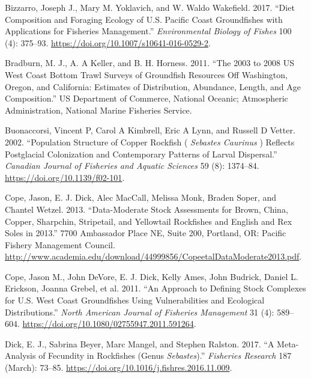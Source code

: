 \documentclass[11pt,
  english,
  a4paper,
]{article}
\begin{document}
\leavevmode\tagmcend\tagstructend


\hypertarget{refs}{}
\begin{cslreferences}
\leavevmode\hypertarget{ref-bizzarro_diet_2017-1}{}%
Bizzarro, Joseph J., Mary M. Yoklavich, and W. Waldo Wakefield. 2017. ``Diet Composition and Foraging Ecology of U.S. Pacific Coast Groundfishes with Applications for Fisheries Management.'' \emph{Environmental Biology of Fishes} 100 (4): 375--93. \url{https://doi.org/10.1007/s10641-016-0529-2}.

\leavevmode\hypertarget{ref-bradburn_2003_2011}{}%
Bradburn, M. J., A. A Keller, and B. H. Horness. 2011. ``The 2003 to 2008 US West Coast Bottom Trawl Surveys of Groundfish Resources Off Washington, Oregon, and California: Estimates of Distribution, Abundance, Length, and Age Composition.'' US Department of Commerce, National Oceanic; Atmospheric Administration, National Marine Fisheries Service.

\leavevmode\hypertarget{ref-buonaccorsi_population_2002}{}%
Buonaccorsi, Vincent P, Carol A Kimbrell, Eric A Lynn, and Russell D Vetter. 2002. ``Population Structure of Copper Rockfish ( \emph{Sebastes Caurinus} ) Reflects Postglacial Colonization and Contemporary Patterns of Larval Dispersal.'' \emph{Canadian Journal of Fisheries and Aquatic Sciences} 59 (8): 1374--84. \url{https://doi.org/10.1139/f02-101}.

\leavevmode\hypertarget{ref-cope_data-moderate_2013}{}%
Cope, Jason, E. J. Dick, Alec MacCall, Melissa Monk, Braden Soper, and Chantel Wetzel. 2013. ``Data-Moderate Stock Assessments for Brown, China, Copper, Sharpchin, Stripetail, and Yellowtail Rockfishes and English and Rex Soles in 2013.'' 7700 Ambassador Place NE, Suite 200, Portland, OR: Pacific Fishery Management Council. \url{http://www.academia.edu/download/44999856/CopeetalDataModerate2013.pdf}.

\leavevmode\hypertarget{ref-cope_approach_2011}{}%
Cope, Jason M., John DeVore, E. J. Dick, Kelly Ames, John Budrick, Daniel L. Erickson, Joanna Grebel, et al. 2011. ``An Approach to Defining Stock Complexes for U.S. West Coast Groundfishes Using Vulnerabilities and Ecological Distributions.'' \emph{North American Journal of Fisheries Management} 31 (4): 589--604. \url{https://doi.org/10.1080/02755947.2011.591264}.

\leavevmode\hypertarget{ref-dick_meta-analysis_2017}{}%
Dick, E. J., Sabrina Beyer, Marc Mangel, and Stephen Ralston. 2017. ``A Meta-Analysis of Fecundity in Rockfishes (Genus \emph{Sebastes}).'' \emph{Fisheries Research} 187 (March): 73--85. \url{https://doi.org/10.1016/j.fishres.2016.11.009}.


\end{cslreferences}
\end{document}
